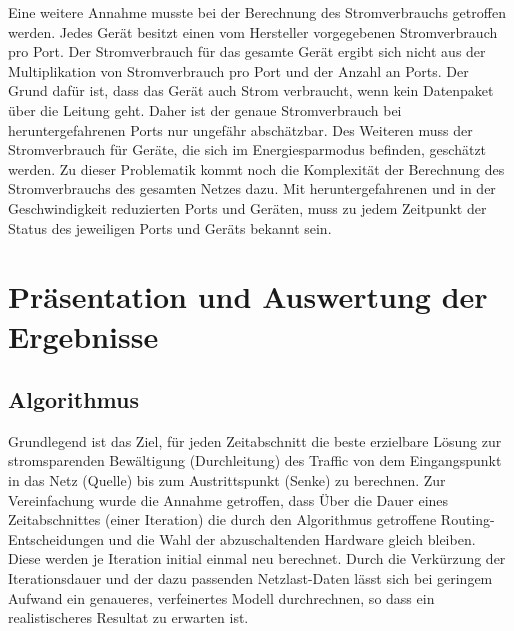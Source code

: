 \documentclass[12pt,titlepage]{article}
\begin{document}
 
Eine weitere Annahme musste bei der Berechnung des Stromverbrauchs getroffen werden. Jedes Gerät besitzt einen vom Hersteller vorgegebenen Stromverbrauch pro Port. Der Stromverbrauch für das gesamte Gerät ergibt sich nicht aus der Multiplikation von Stromverbrauch pro Port und der Anzahl an Ports. Der Grund dafür ist, dass das Gerät auch Strom verbraucht, wenn kein Datenpaket über die Leitung geht. Daher ist der genaue Stromverbrauch bei heruntergefahrenen Ports nur ungefähr abschätzbar. Des Weiteren muss der Stromverbrauch für Geräte, die sich im Energiesparmodus befinden, geschätzt werden. Zu dieser Problematik kommt noch die Komplexität der Berechnung des Stromverbrauchs des gesamten Netzes dazu. Mit heruntergefahrenen und in der Geschwindigkeit reduzierten Ports und Geräten, muss zu jedem Zeitpunkt der Status des jeweiligen Ports und Geräts bekannt sein.  


\section{Präsentation und Auswertung der Ergebnisse} \label{Ergebnisse}
\subsection{Algorithmus} \label{subsec:ErgAlg}
Grundlegend ist das Ziel, für jeden Zeitabschnitt die beste erzielbare Lösung zur stromsparenden Bewältigung (Durchleitung) des Traffic von dem Eingangspunkt in das Netz (Quelle) bis zum Austrittspunkt (Senke) zu berechnen. Zur Vereinfachung wurde die Annahme getroffen, dass Über die Dauer eines Zeitabschnittes (einer Iteration) die durch den Algorithmus getroffene Routing-Entscheidungen und die Wahl der abzuschaltenden Hardware gleich bleiben. Diese werden je Iteration initial einmal neu berechnet. Durch die Verkürzung der Iterationsdauer und der dazu passenden Netzlast-Daten lässt sich bei geringem Aufwand ein genaueres, verfeinertes Modell durchrechnen, so dass ein realistischeres Resultat zu erwarten ist.
\end{document}
